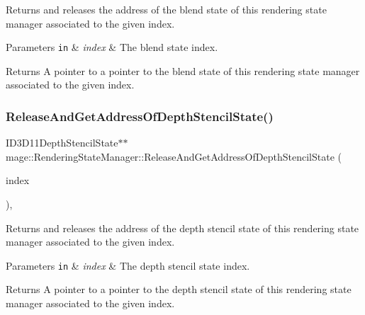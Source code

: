 Returns and releases the address of the blend state of this rendering state manager associated to the given index.


\begin{DoxyParams}[1]{Parameters}
\mbox{\tt in}  & {\em index} & The blend state index. \\
\hline
\end{DoxyParams}
\begin{DoxyReturn}{Returns}
A pointer to a pointer to the blend state of this rendering state manager associated to the given index. 
\end{DoxyReturn}
\hypertarget{classmage_1_1_rendering_state_manager_a2387df8ca417a4e743551e9a59af19de}{}\label{classmage_1_1_rendering_state_manager_a2387df8ca417a4e743551e9a59af19de} 
\subsubsection{\texorpdfstring{Release\+And\+Get\+Address\+Of\+Depth\+Stencil\+State()}{ReleaseAndGetAddressOfDepthStencilState()}}
{\footnotesize\ttfamily I\+D3\+D11\+Depth\+Stencil\+State$\ast$$\ast$ mage\+::\+Rendering\+State\+Manager\+::\+Release\+And\+Get\+Address\+Of\+Depth\+Stencil\+State (\begin{DoxyParamCaption}\item[{\hyperlink{classmage_1_1_rendering_state_manager_a7a8ab9ab2d4eb992a364d09c9eec636a}{Depth\+Stencil\+State\+Index}}]{index }\end{DoxyParamCaption})\hspace{0.3cm}{\ttfamily [private]}, {\ttfamily [noexcept]}}

Returns and releases the address of the depth stencil state of this rendering state manager associated to the given index.


\begin{DoxyParams}[1]{Parameters}
\mbox{\tt in}  & {\em index} & The depth stencil state index. \\
\hline
\end{DoxyParams}
\begin{DoxyReturn}{Returns}
A pointer to a pointer to the depth stencil state of this rendering state manager associated to the given index. 
\end{DoxyReturn}
\hypertarget{classmage_1_1_rendering_state_manager_a6328d147d3de27e9be2def38cdee12e2}{}\label{classmage_1_1_rendering_state_manager_a6328d147d3de27e9be2def38cdee12e2} 
